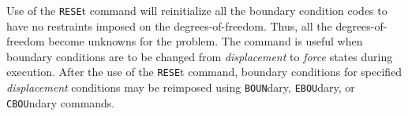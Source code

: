 \headb

Use of the {\tt RESE}t command will reinitialize all the
boundary condition codes to have no restraints imposed on
the degrees-of-freedom.  Thus, all the degrees-of-freedom
become unknowns for the problem.  The command is useful when
boundary conditions are to be changed from {\it displacement} to
{\it force} states during execution.
After the use of the {\tt RESE}t  command,  boundary
conditions for specified {\it displacement} conditions may
be reimposed using {\tt BOUN}dary, {\tt EBOU}dary, or {\tt CBOU}ndary
commands.
\vfil\eject
